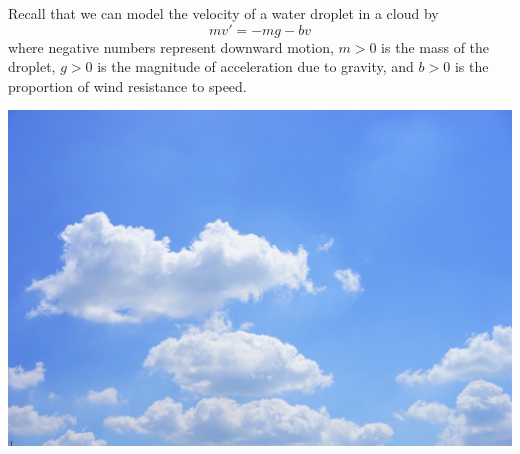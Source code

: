 
\begin{applicationActivities}



\begin{observation}
Recall that we can model the velocity of a water droplet in a cloud by
\[mv'=-mg-bv\]
where negative numbers represent downward motion,
\(m>0\) is the mass of the droplet, 
\(g>0\) is the magnitude of acceleration due to gravity, and 
\(b>0\) is the proportion of wind resistance to speed.
\begin{center}
\includegraphics[scale=0.2]{media/cloud.jpg}
\end{center}
\end{observation}

%
%


\end{applicationActivities}
